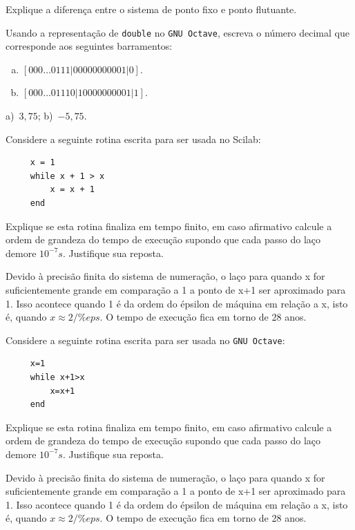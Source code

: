 \begin{exer}
  Explique a diferença entre o sistema de ponto fixo e ponto flutuante.
\end{exer}


\ifisoctave
\begin{exer}
  Usando a representação de \verb+double+ no \verb+GNU Octave+, escreva o número decimal que corresponde aos seguintes barramentos:
  \begin{enumerate}[a)]
  \item $[000\ldots 0111|00000000001|0]$.
  \item $[000\ldots 01110|10000000001|1]$.
  \end{enumerate}
\end{exer}
\begin{resp}
  a)~$3,75$; b)~$-5,75$.
\end{resp}
\fi


\ifisscilab
\begin{exer}Considere a seguinte rotina escrita para ser usada no Scilab:
 \begin{verbatim}
     x = 1
     while x + 1 > x
         x = x + 1
     end
 \end{verbatim}
 Explique se esta rotina finaliza em tempo finito, em caso afirmativo calcule a ordem de grandeza do tempo de execução supondo que cada passo do laço demore $10^{-7}s$. Justifique sua reposta.
 \end{exer}
\begin{resp}
 Devido à precisão finita do sistema de numeração, o laço para quando x for suficientemente grande em comparação a 1 a ponto de x+1 ser aproximado para 1. Isso acontece quando 1 é da ordem do épsilon de máquina em relação a x, isto é, quando $x\approx 2/\%eps$. O tempo de execução fica em torno de 28 anos.
\end{resp}

 \fi



\ifisoctave
\begin{exer}Considere a seguinte rotina escrita para ser usada no \verb+GNU Octave+:
 \begin{verbatim}
     x=1
     while x+1>x
         x=x+1
     end
 \end{verbatim}
 Explique se esta rotina finaliza em tempo finito, em caso afirmativo calcule a ordem de grandeza do tempo de execução supondo que cada passo do laço demore $10^{-7}s$. Justifique sua reposta.
 \end{exer}
\begin{resp}
 Devido à precisão finita do sistema de numeração, o laço para quando x for suficientemente grande em comparação a 1 a ponto de x+1 ser aproximado para 1. Isso acontece quando 1 é da ordem do épsilon de máquina em relação a x, isto é, quando $x\approx 2/\%eps$. O tempo de execução fica em torno de 28 anos.
\end{resp}
 \fi

